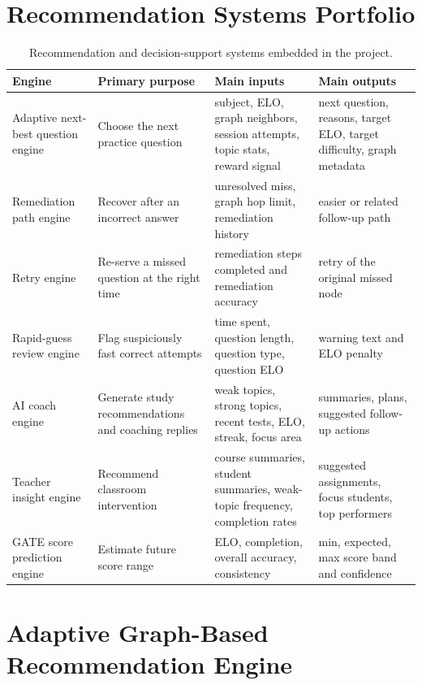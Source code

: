 \documentclass[10pt,twocolumn,a4paper]{article}
\begin{document}
\section{Recommendation Systems Portfolio}
\begin{table}[t]
\centering
\footnotesize
\begin{tabular}{>{\raggedright\arraybackslash}p{} >{\raggedright\arraybackslash}p{} >{\raggedright\arraybackslash}p{} >{\raggedright\arraybackslash}p{}}
\toprule
Engine & Primary purpose & Main inputs & Main outputs \\
\midrule
Adaptive next-best question engine & Choose the next practice question & subject, ELO, graph neighbors, session attempts, topic stats, reward signal & next question, reasons, target ELO, target difficulty, graph metadata \\
Remediation path engine & Recover after an incorrect answer & unresolved miss, graph hop limit, remediation history & easier or related follow-up path \\
Retry engine & Re-serve a missed question at the right time & remediation steps completed and remediation accuracy & retry of the original missed node \\
Rapid-guess review engine & Flag suspiciously fast correct attempts & time spent, question length, question type, question ELO & warning text and ELO penalty \\
AI coach engine & Generate study recommendations and coaching replies & weak topics, strong topics, recent tests, ELO, streak, focus area & summaries, plans, suggested follow-up actions \\
Teacher insight engine & Recommend classroom intervention & course summaries, student summaries, weak-topic frequency, completion rates & suggested assignments, focus students, top performers \\
GATE score prediction engine & Estimate future score range & ELO, completion, overall accuracy, consistency & min, expected, max score band and confidence \\
\bottomrule
\end{tabular}
\caption{Recommendation and decision-support systems embedded in the project.}
\end{table}

\section{Adaptive Graph-Based Recommendation Engine}
\end{document}

